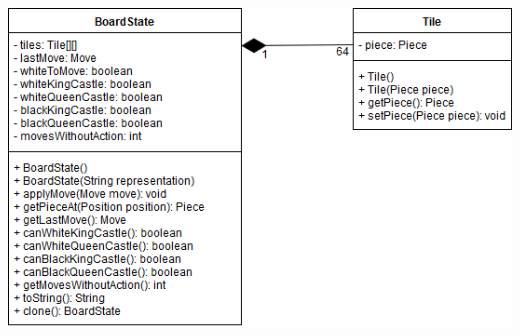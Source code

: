 \documentclass[parskip=full]{scrartcl}
\begin{document}
\begin{minipage}{\linewidth}
			\centering
			\includegraphics[width=1\linewidth]{Diagramme/BoardState}
			\label{fig:boardState}
		\end{minipage}
\end{document}
